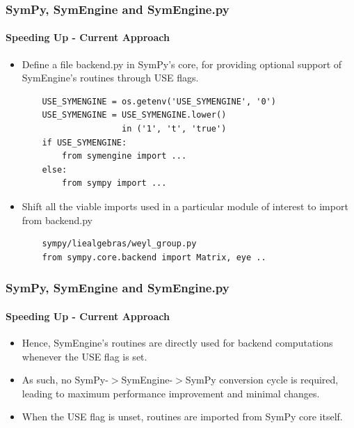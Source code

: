 \documentclass{beamer}
\begin{document}
\begin{frame}[fragile]
\frametitle{SymPy, SymEngine and SymEngine.py}
\framesubtitle{Speeding Up - Current Approach}
\begin{itemize}
\item Define a file backend.py in SymPy's core, for providing optional support of
    SymEngine's routines through USE flags.
    \begin{verbatim}
    USE_SYMENGINE = os.getenv('USE_SYMENGINE', '0')
    USE_SYMENGINE = USE_SYMENGINE.lower() 
                    in ('1', 't', 'true')
    if USE_SYMENGINE:
        from symengine import ...
    else:
        from sympy import ...
    \end{verbatim}
\item Shift all the viable imports used in a particular module of interest 
    to import from backend.py
    \begin{verbatim}
    sympy/liealgebras/weyl_group.py
    from sympy.core.backend import Matrix, eye ..
    \end{verbatim}
\end{itemize}
\end{frame}


\begin{frame}[fragile]
\frametitle{SymPy, SymEngine and SymEngine.py}
\framesubtitle{Speeding Up - Current Approach}
\begin{itemize}
\item Hence, SymEngine's routines are directly used for backend computations
    whenever the USE flag is set.
\item As such, no SymPy-$>$SymEngine-$>$SymPy conversion cycle is required, leading
    to maximum performance improvement and minimal changes.
\item When the USE flag is unset, routines are imported from SymPy core itself.
\end{itemize}
\end{frame}
\end{document}
